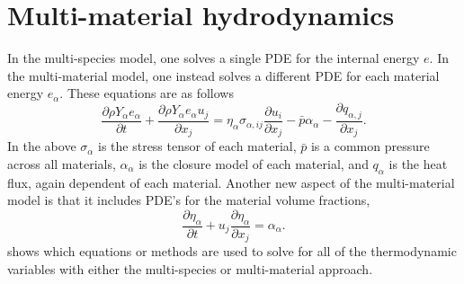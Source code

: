 \documentclass[oneside,a4paper,11pt]{report}
\begin{document}
\section{Multi-material hydrodynamics}
\label{sec:multi_mat_hydro}
In the multi-species model, one solves a single PDE for the internal energy $e$. In the multi-material model, one instead solves a different PDE for each material energy $e_\alpha$. These equations are as follows
\begin{equation}
    \label{eq:multi_mat_hydro_species_energy}
    \frac{\partial \rho Y_\alpha e_\alpha}{\partial t} + \frac{\partial \rho Y_\alpha e_\alpha u_j}{\partial x_j} = \eta_\alpha \sigma_{\alpha,ij} \frac{\partial u_i}{\partial x_j} - \bar{p} \alpha_\alpha - \frac{\partial q_{\alpha,j}}{\partial x_j}.
\end{equation}
In the above $\sigma_\alpha$ is the stress tensor of each material, $\bar{p}$ is a common pressure across all materials, $\alpha_\alpha$ is the closure model of each material, and $q_\alpha$ is the heat flux, again dependent of each material. Another new aspect of the multi-material model is that it includes PDE's for the material volume fractions, 
\begin{equation}
    \label{eq:multi_mat_hydro_vol_fractions}
    \frac{\partial \eta_\alpha}{\partial t} + u_j \frac{\partial \eta_\alpha}{\partial x_j} = \alpha_\alpha.
\end{equation}
 shows which equations or methods are used to solve for all of the thermodynamic variables with either the multi-species or multi-material approach.
\end{document}
